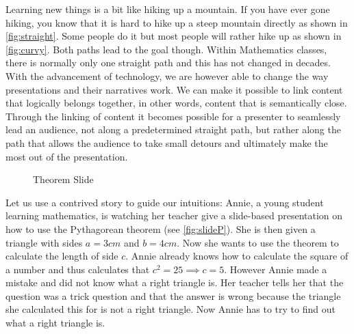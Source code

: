 \documentclass{llncs}
\begin{document}
Learning new things is a bit like hiking up a mountain. If you have ever gone hiking, you
know that it is hard to hike up a steep mountain directly as shown in
\autoref{fig:straight}. Some people do it but most people will rather hike up as shown in
\autoref{fig:curvy}. Both paths lead to the goal though. Within Mathematics classes, there
is normally only one straight path and this has not changed in decades. With the
advancement of technology, we are however able to change the way presentations and their
narratives work. We can make it possible to link content that logically belongs together,
in other words, content that is semantically close. Through the linking of content it
becomes possible for a presenter to seamlessly lead an audience, not along a predetermined
straight path, but rather along the path that allows the audience to take small detours
and ultimately make the most out of the presentation.

\begin{figure}\centering\vspace{-2em}
  \vspace{-.5em}
  \caption{Theorem Slide}\label{fig:slideP}
  \vspace{-15pt}
\end{figure}

Let us use a contrived story to guide our intuitions: Annie, a young student learning
mathematics, is watching her teacher give a slide-based presentation on how to use the
Pythagorean theorem (see \autoref{fig:slideP}). She is then given a triangle with sides
$a = 3 cm$ and $b = 4 cm$. Now she wants to use the theorem to calculate the length of
side $c$. Annie already knows how to calculate the square of a number and thus calculates
that $c^2 = 25 \implies c = 5$. However Annie made a mistake and did not know what a right
triangle is. Her teacher tells her that the question was a trick question and that the
answer is wrong because the triangle she calculated this for is not a right triangle. Now
Annie has to try to find out what a right triangle is.
\end{document}
